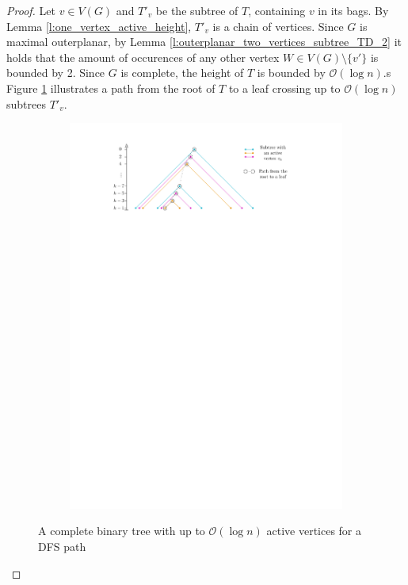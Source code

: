 \begin{proof}
	Let $v \in V(G)$ and $T'_{v}$ be the subtree of $T$, containing $v$ in its bags. By Lemma \ref{l:one_vertex_active_height}, $T'_{v}$ is a chain of vertices. Since $G$ is maximal outerplanar, by Lemma \ref{l:outerplanar_two_vertices_subtree_TD_2} it holds that the amount of occurences of any other vertex $W\in V(G)\setminus\{v'\}$ is bounded by 2. Since $G$ is complete, the height of $T$ is bounded by $\mathcal{O}(\log n)$.s Figure \ref{im:active_vertices_log_n} illustrates a path from the root of $T$ to a leaf crossing up to $\mathcal{O}(\log n)$ subtrees $T'_{v}$.
		\begin{figure}[H]
		\centering
		\begin{subfigure}{\textwidth}
			\centering
			\includegraphics[page=1,width=0.9\linewidth]{graphics/active_vertices_log_n.pdf}
		\end{subfigure}
		\caption{A complete binary tree with up to $\mathcal{O}(\log n)$ active vertices for a DFS path}\label{im:active_vertices_log_n}
	\end{figure}


\end{proof}
